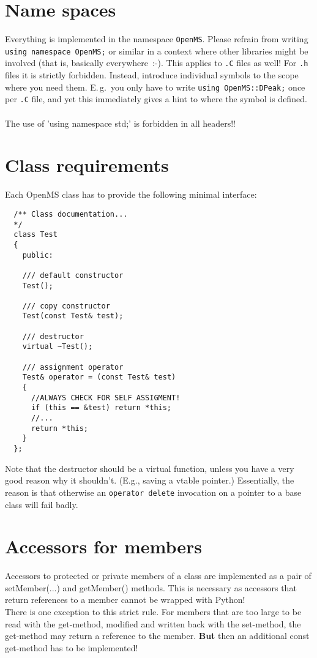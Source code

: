 \documentclass[a4]{article}
\begin{document}
\section{Name spaces}

Everything is implemented in the namespace \texttt{OpenMS}.  Please refrain
from writing \texttt{using namespace OpenMS;} or similar in a context where
other libraries might be involved (that is, basically everywhere~:-).  This
applies to \texttt{.C} files as well!  For \texttt{.h} files it is strictly
forbidden.  Instead, introduce individual symbols to the scope where you need
them.  E.\,g.\ you only have to write \texttt{using OpenMS::DPeak;} once per
\texttt{.C} file, and yet this immediately gives a hint to where the symbol is
defined.\\
\\
The use of 'using namespace std;' is forbidden in all headers!!


\section{Class requirements}

Each OpenMS class has to provide the following minimal interface:
\begin{verbatim}
  /** Class documentation...
  */
  class Test
  {
    public:

    /// default constructor
    Test();

    /// copy constructor
    Test(const Test& test);

    /// destructor
    virtual ~Test();

    /// assignment operator
    Test& operator = (const Test& test)
    {
      //ALWAYS CHECK FOR SELF ASSIGMENT!
      if (this == &test) return *this;
      //...
      return *this;
    }
  };
\end{verbatim}
Note that the destructor should be a virtual function, unless you have a very
good reason why it shouldn't.  (E.g., saving a vtable pointer.)  Essentially,
the reason is that otherwise an \texttt{operator delete} invocation on a
pointer to a base class will fail badly.

\section{Accessors for members}
Accessors to protected or private members of a class are implemented as a pair
of setMember(...) and getMember() methods.
This is necessary as accessors that return references to a member cannot be wrapped with Python!\\
There is one exception to this strict rule. For members that are too large to be
read with the get-method, modified and written back with the set-method, the
get-method may return a reference to the member. {\bf But} then an additional const
get-method has to be implemented!
\end{document}
